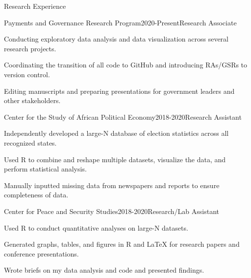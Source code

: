 \documentclass[10pt]{resume} %
\begin{document}
	\begin{rSection}{Research Experience}
		
		\begin{rSubsection}{Payments and Governance Research Program}{2020-Present}{Research Associate}{}
		\item Conducting exploratory data analysis and data visualization across several research projects.
		\item Coordinating the transition of all code to GitHub and introducing RAs/GSRs to version control. 
		\item Editing manuscripts and preparing presentations for government leaders and other stakeholders.
		\end{rSubsection}
		
		\begin{rSubsection}{Center for the Study of African Political Economy}{2018-2020}{Research Assistant}{}
			\item Independently developed a large-N database of election statistics across all recognized states.
			\item Used R to combine and reshape multiple datasets, visualize the data, and perform statistical analysis.
			\item Manually inputted missing data from newspapers and reports to ensure completeness of data. 
		\end{rSubsection}
		
		\begin{rSubsection}{Center for Peace and Security Studies}{2018-2020}{Research/Lab Assistant}{}
			\item Used R to conduct quantitative analyses on large-N datasets.
			\item Generated graphs, tables, and figures in R and LaTeX for research papers and conference presentations.
			\item Wrote briefs on my data analysis and code and presented findings. 
			
		\end{rSubsection}
		
		

\end{rSection}
\end{document}

